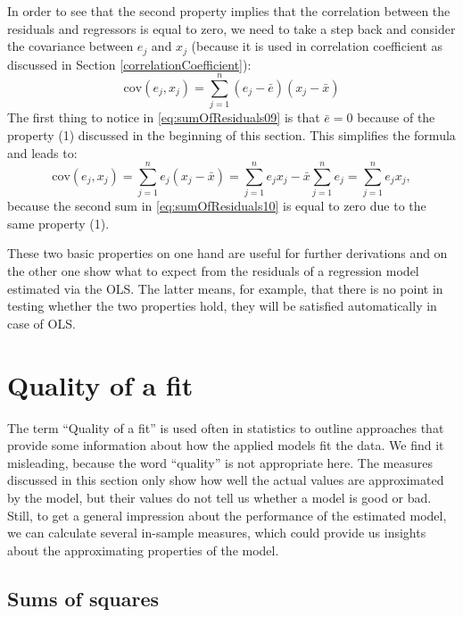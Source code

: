 \documentclass[
]{book}
\theoremstyle{definition}
\theoremstyle{definition}
\theoremstyle{definition}
\theoremstyle{definition}
\theoremstyle{remark}
\begin{document}
In order to see that the second property implies that the correlation between the residuals and regressors is equal to zero, we need to take a step back and consider the covariance between \(e_j\) and \(x_j\) (because it is used in correlation coefficient as discussed in Section \ref{correlationCoefficient}):
\begin{equation}
    \mathrm{cov}(e_j,x_j) = \sum_{j=1}^n (e_j - \bar{e})(x_j - \bar{x})
    \label{eq:sumOfResiduals09}
\end{equation}
The first thing to notice in \eqref{eq:sumOfResiduals09} is that \(\bar{e}=0\) because of the property (1) discussed in the beginning of this section. This simplifies the formula and leads to:
\begin{equation}
    \mathrm{cov}(e_j,x_j) = \sum_{j=1}^n e_j (x_j - \bar{x}) = \sum_{j=1}^n e_j x_j - \bar{x} \sum_{j=1}^n e_j = \sum_{j=1}^n e_j x_j ,
    \label{eq:sumOfResiduals10}
\end{equation}
because the second sum in \eqref{eq:sumOfResiduals10} is equal to zero due to the same property (1).

These two basic properties on one hand are useful for further derivations and on the other one show what to expect from the residuals of a regression model estimated via the OLS. The latter means, for example, that there is no point in testing whether the two properties hold, they will be satisfied automatically in case of OLS.

\section{Quality of a fit}\label{linearRegressionSimpleQualityOfFit}

The term ``Quality of a fit'' is used often in statistics to outline approaches that provide some information about how the applied models fit the data. We find it misleading, because the word ``quality'' is not appropriate here. The measures discussed in this section only show how well the actual values are approximated by the model, but their values do not tell us whether a model is good or bad. Still, to get a general impression about the performance of the estimated model, we can calculate several in-sample measures, which could provide us insights about the approximating properties of the model.

\subsection{Sums of squares}\label{linearRegressionSimpleQualityOfFitSSE}
\end{document}
